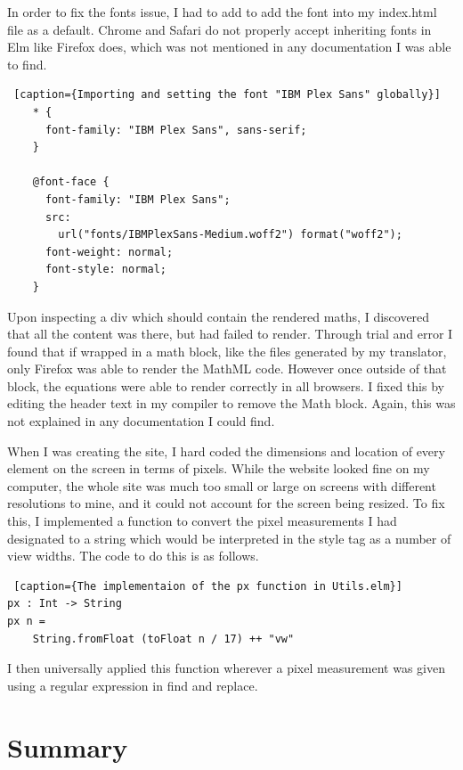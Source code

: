 \documentclass{l4proj}
\begin{document}
In order to fix the fonts issue, I had to add to add the font into my index.html file as a default.  Chrome and Safari do not properly accept inheriting fonts in Elm like Firefox does, which was not mentioned in any documentation I was able to find.

\begin{lstlisting} [caption={Importing and setting the font "IBM Plex Sans" globally}]
    * {
      font-family: "IBM Plex Sans", sans-serif;
    }
    
    @font-face {
      font-family: "IBM Plex Sans";
      src:
        url("fonts/IBMPlexSans-Medium.woff2") format("woff2");
      font-weight: normal;
      font-style: normal;
    }
\end{lstlisting}

Upon inspecting a div which should contain the rendered maths, I discovered that all the content was there, but had failed to render.  Through trial and error I found that if wrapped in a math block, like the files generated by my translator, only Firefox was able to render the MathML code.  However once outside of that block, the equations were able to render correctly in all browsers.  I fixed this by editing the header text in my compiler to remove the Math block.  Again, this was not explained in any documentation I could find.

When I was creating the site, I hard coded the dimensions and location of every element on the screen in terms of pixels.  While the website looked fine on my computer, the whole site was much too small or large on screens with different resolutions to mine, and it could not account for the screen being resized.  To fix this, I implemented a function to convert the pixel measurements I had designated to a string which would be interpreted in the style tag as a number of view widths.  The code to do this is as follows.

\begin{lstlisting} [caption={The implementaion of the px function in Utils.elm}]
px : Int -> String
px n =
    String.fromFloat (toFloat n / 17) ++ "vw"
\end{lstlisting}

I then universally applied this function wherever a pixel measurement was given using a regular expression in find and replace.

\section{Summary}
\end{document}
